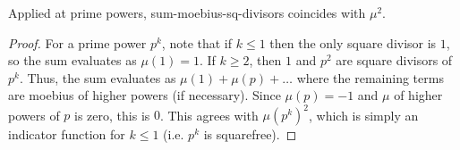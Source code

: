 \begin{theorem}
\label{sum_moebius_sq_divisors_apply_prime_pow}
\leanok
Applied at prime powers, sum-moebius-sq-divisors coincides with $\mu^2$.
\end{theorem}
\begin{proof}
\leanok
For a prime power $p^k$, note that if $k\leq 1$ then the only square divisor is $1$, so the sum
    evaluates as $\mu(1)=1$. If $k\geq 2$, then $1$ and $p^2$ are square divisors of $p^k$. Thus,
    the sum evaluates as $\mu(1)+\mu(p)+\ldots$ where the remaining terms are moebius of higher
    powers (if necessary). Since $\mu(p)=-1$ and $\mu$ of higher powers of $p$ is zero, this is
    $0$. This agrees with $\mu(p^k)^2$, which is simply an indicator function for $k\leq 1$ (i.e.
    $p^k$ is squarefree).
\end{proof}
